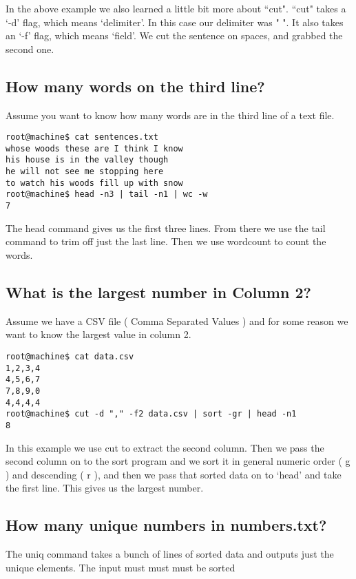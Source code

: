 \documentclass[12pt,a4paper]{article}
\begin{document}
In the above example we also learned a little bit more about ``cut". ``cut"
takes a `-d' flag, which means `delimiter'. In this case our delimiter was " ".
It also takes an `-f' flag, which means `field'. We cut the sentence on spaces,
and grabbed the second one.

\subsection{How many words on the third line?}
Assume you want to know how many words are in the third line of a text file.

\begin{lstlisting}[style=term]
root@machine$ cat sentences.txt
whose woods these are I think I know
his house is in the valley though
he will not see me stopping here
to watch his woods fill up with snow
root@machine$ head -n3 | tail -n1 | wc -w
7
\end{lstlisting}

The head command gives us the first three lines. From there we use the tail
command to trim off just the last line. Then we use wordcount to count the
words.

\subsection{What is the largest number in Column 2?}

Assume we have a CSV file ( Comma Separated Values ) and for some reason we want
to know the largest value in column 2.

\begin{lstlisting}[style=term]
root@machine$ cat data.csv
1,2,3,4
4,5,6,7
7,8,9,0
4,4,4,4
root@machine$ cut -d "," -f2 data.csv | sort -gr | head -n1
8
\end{lstlisting}
 
In this example we use cut to extract the second column. Then we pass the second
column on to the sort program and we sort it in general numeric order ( g ) and
descending ( r ), and then we pass that sorted data on to `head' and take the
first line. This gives us the largest number.

\subsection{How many unique numbers in numbers.txt?}

The uniq command takes a bunch of lines of sorted data and outputs just the
unique elements. The input must must must be sorted
\end{document}
